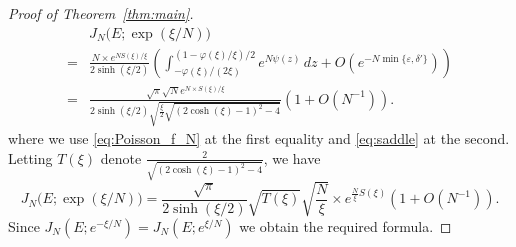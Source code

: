 \begin{proof}[Proof of Theorem~\ref{thm:main}]
\begin{equation*}
\begin{split}
  &J_N\bigl(E;\exp(\xi/N)\bigr)
  \\
  =&
  \frac{N\times e^{N S(\xi)/\xi}}{2\sinh(\xi/2)}
  \left(
    \int_{-\varphi(\xi)/(2\xi)}^{(1-\varphi(\xi)/\xi)/2}
    e^{N\psi(z)}\,dz
    +O\left(e^{-N\min\{\varepsilon,\delta'\}}\right)
  \right)
  \\
  =&
  \frac{\sqrt{\pi}\sqrt{N} e^{N\times S(\xi)/\xi}}
       {2\sinh(\xi/2)\sqrt{\frac{\xi}{2}\sqrt{(2\cosh(\xi)-1)^2-4}}}
  \left(1+O(N^{-1})\right).
\end{split}
\end{equation*}
where we use \eqref{eq:Poisson_f_N} at the first equality and \eqref{eq:saddle} at the second.
Letting $T(\xi)$ denote $\frac{2}{\sqrt{(2\cosh(\xi)-1)^2-4}}$, we have
\begin{equation*}
  J_N\bigl(E;\exp(\xi/N)\bigr)
  =
  \frac{\sqrt{\pi}}{2\sinh(\xi/2)}
  \sqrt{T(\xi)}
  \sqrt{\frac{N}{\xi}}
  \times
  e^{\frac{N}{\xi}S(\xi)}
  \left(1+O(N^{-1})\right).
\end{equation*}
Since $J_{N}(E;e^{-\xi/N})=J_{N}(E;e^{\xi/N})$ we obtain the required formula.
\end{proof}